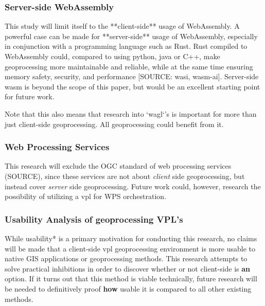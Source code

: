 \subsubsection*{Server-side WebAssembly} %

This study will limit itself to the **client-side** usage of WebAssembly. 
A powerful case can be made for **server-side** usage of WebAssembly, especially in conjunction with a programming language such as Rust. 
Rust compiled to WebAssembly could, compared to using python, java or C++, make geoprocessing more maintainable and reliable, while at the same time ensuring memory safety, security, and performance [SOURCE: wasi, wasm-ai]. 
Server-side wasm is beyond the scope of this paper, but would be an excellent starting point for future work. 

Note that this also means that research into `wagl`'s is important for more than just client-side geoprocessing. All geoprocessing could benefit from it.



\subsubsection*{Web Processing Services} %

This research will exclude the OGC standard of web processing services (SOURCE), since these services are not about \emph{client} side geoprocessing, but instead cover \emph{server} side geoprocessing. 
Future work could, however, research the possibility of utilizing a vpl for WPS orchestration. 



\subsubsection*{Usability Analysis of geoprocessing VPL's} %

While usability* is a primary motivation for conducting this research, no claims will be made that a client-side vpl geoprocessing environment is more usable to native GIS applications or geoprocessing methods. This research attempts to solve practical inhibitions in order to discover whether or not client-side is \textbf{an} option. If it turns out that this method is viable technically, future research will be needed to definitively proof \textbf{how} usable it is compared to all other existing methods.  


